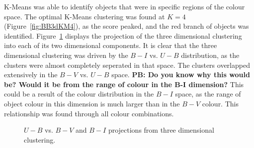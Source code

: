 K-Means was able to identify objects that were in specific regions of the colour space.
The optimal K-Means clustering was found at $K=4$ (Figure~\ref{fig:BB3dKM4}), as the score peaked, and the red branch of objects was identified.
Figure~\ref{fig:BB3dKMproj} displays the projection of the three dimensional clustering into each of its two dimensional components. 
It is clear that the three dimensional clustering was driven by the $B - I$ vs. $U - B$ distribution, as the clusters were almost completely seperated in that space.
The clusters overlapped extensively in the $B - V$ vs. $U - B$ space. \textbf{PB: Do you know why this would be? Would it be from the range of colour in the B-I dimension?}
This could be a result of the colour distribution in the $B - I$ space, as the range of object colour in this dimension is much larger than in the $B - V$ colour.
This relationship was found through all colour combinations.

\begin{figure}
\centering
{}
\hfill
{}
\caption{$U - B$ vs. $B - V$ and $B - I$ projections from three dimensional clustering.}
\label{fig:BB3dKMproj}
\end{figure}

